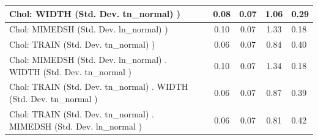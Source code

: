 \begin{table}
\begin{center}
\begin{tabular}{|l|l|c|c|c|l|}
			\hline
			 Chol: WIDTH (Std. Dev. tn_normal) ) &  & 0.08 & 0.07 & 1.06 & 0.29 \\
			\hline
			 Chol: MIMEDSH (Std. Dev. ln_normal) ) &  & 0.10 & 0.07 & 1.33 & 0.18 \\
			\hline
			 Chol: TRAIN (Std. Dev. tn_normal) ) &  & 0.06 & 0.07 & 0.84 & 0.40 \\
			\hline
			 Chol: MIMEDSH (Std. Dev. ln_normal) . WIDTH (Std. Dev.   tn_normal ) &  & 0.10 & 0.07 & 1.34 & 0.18 \\
			\hline
			 Chol: TRAIN (Std. Dev. tn_normal) . WIDTH (Std. Dev.   tn_normal ) &  & 0.06 & 0.07 & 0.87 & 0.39 \\
			\hline
			 Chol: TRAIN (Std. Dev. tn_normal) . MIMEDSH (Std. Dev.   ln_normal ) &  & 0.06 & 0.07 & 0.81 & 0.42 \\
			\hline
		\end{tabular}
	\end{center}
\end{table}